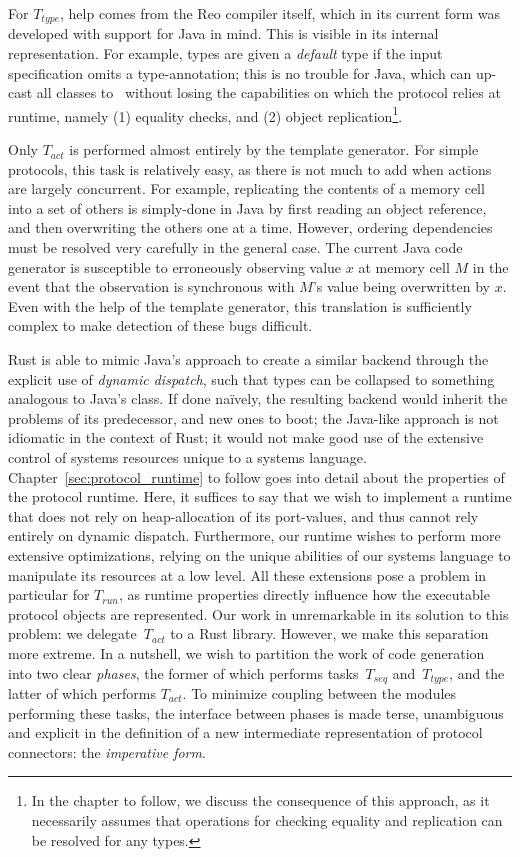 For $T_{type}$, help comes from the Reo compiler itself, which in its current form was developed with support for Java in mind. This is visible in its internal representation. For example, types are given a \textit{default} type if the input specification omits a type-annotation; this is no trouble for Java, which can up-cast all classes to~ without losing the capabilities on which the protocol relies at runtime, namely (1) equality checks, and (2) object replication\footnote{In the chapter to follow, we discuss the consequence of this approach, as it necessarily assumes that operations for checking equality and replication can be resolved for any types.}.

Only $T_{act}$ is performed almost entirely by the template generator. For simple protocols, this task is relatively easy, as there is not much to add when actions are largely concurrent. For example, replicating the contents of a memory cell into a set of others is simply-done in Java by first reading an object reference, and then overwriting the others one at a time. However, ordering dependencies must be resolved very carefully in the general case. The current Java code generator is susceptible to erroneously observing value $x$ at memory cell $M$ in the event that the observation is synchronous with $M$'s value being overwritten by $x$. Even with the help of the template generator, this translation is sufficiently complex to make detection of these bugs difficult.

Rust is able to mimic Java's approach to create a similar backend through the explicit use of \textit{dynamic dispatch}, such that types can be collapsed to something analogous to Java's  class. If done na\"ively, the resulting backend would inherit the problems of its predecessor, and new ones to boot; the Java-like approach is not idiomatic in the context of Rust; it would not make good use of the extensive control of systems resources unique to a systems language. Chapter~\ref{sec:protocol_runtime} to follow goes into detail about the properties of the protocol runtime. Here, it suffices to say that we wish to implement a runtime that does not rely on heap-allocation of its port-values, and thus cannot rely entirely on dynamic dispatch. Furthermore, our runtime wishes to perform more extensive optimizations, relying on the unique abilities of our systems language to manipulate its resources at a low level. All these extensions pose a problem in particular for $T_{run}$, as runtime properties directly influence how the executable protocol objects are represented. Our work in unremarkable in its solution to this problem: we delegate~$T_{act}$ to a Rust library. However, we make this separation more extreme. In a nutshell, we wish to partition the work of code generation into two clear \textit{phases}, the former of which performs tasks~$T_{seq}$ and~$T_{type}$, and the latter of which performs $T_{act}$. To minimize coupling between the modules performing these tasks, the interface between phases is made terse, unambiguous and explicit in the definition of a new intermediate representation of protocol connectors: the \textit{imperative form}.

